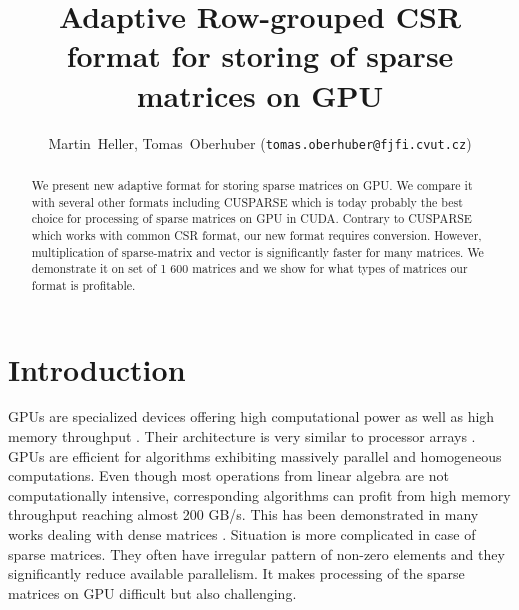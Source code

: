 \documentclass{pj}
\begin{document}
\setcounter{page}{1}


\title{Adaptive Row-grouped CSR format for storing of sparse matrices on GPU}

\author{Martin~Heller, Tomas~Oberhuber ({\tt tomas.oberhuber@fjfi.cvut.cz})}

\address{Department of mathematics, Faculty of Nuclear Sciences and Physical Engineering, Czech Technical University in Prague, Trojanova 13, Praha 2, 120 00, Czech Republic}  







\begin{abstract}
We present new adaptive format for storing sparse matrices on GPU. We compare it with several other formats including CUSPARSE which is today probably the best choice for processing of sparse matrices on GPU in CUDA. Contrary to CUSPARSE which works with common CSR format, our new format requires conversion. However, multiplication of sparse-matrix and vector is significantly faster for many matrices. We demonstrate it on set of 1 600 matrices and we show for what types of matrices our format is profitable.
\end{abstract}



\lstset{language=C,
        basicstyle=\footnotesize,
        numbers=left,
        frame=single,
        firstnumber=auto}

\section{Introduction}
\label{sect:introduction}
GPUs are specialized devices offering high computational power as well as high memory throughput \cite{LeeKimChhuganiDeisherKimNguyenSatishSmelyanskiyChennupatyHammarlundSinghalDubey-2010,OberhuberSuzukiZabka-2011}. Their architecture is very similar to processor arrays \cite{Quinn-2003}. GPUs are efficient for algorithms exhibiting massively parallel and homogeneous computations. Even though most operations from linear algebra are not computationally intensive, corresponding algorithms can profit from high memory throughput reaching almost 200 GB/s. This has been demonstrated in many works dealing with dense matrices \cite{GaloppoGovindarajuHensonManocha-2005,NvidiaCublas-2010,VolkovDemel-2008}. Situation is more complicated in case of sparse matrices. They often have irregular pattern of non-zero elements and they significantly reduce available parallelism. It makes processing of the sparse matrices on GPU difficult but also challenging.
\end{document}
